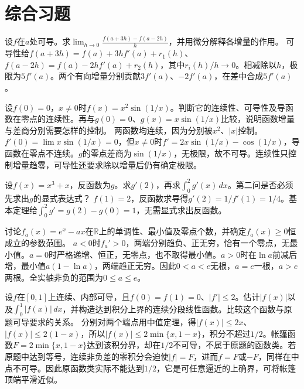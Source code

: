 \par\addvspace{12pt}

\section{综合习题}

设\(f\)在\(a\)处可导。求\(\displaystyle\lim_{h\to0}\frac{f(a+3h)-f(a-2h)}h\)，并用微分解释各增量的作用。
\solutionanswer
可导性给\(f(a+3h)=f(a)+3hf'(a)+r_1(h)\)、\(f(a-2h)=f(a)-2hf'(a)+r_2(h)\)，其中\(r_i(h)/h\to0\)。相减除以\(h\)，极限为\(5f'(a)\)。两个有向增量分别贡献\(3f'(a)\)、\(-2f'(a)\)，在差中合成\(5f'(a)\)。


设\(f(0)=0\)，\(x\ne0\)时\(f(x)=x^2\sin(1/x)\)。判断它的连续性、可导性及导函数在零点的连续性。再与\(g(0)=0\)、\(g(x)=x\sin(1/x)\)比较，说明函数增量与差商分别需要怎样的控制。
\solutionanswer
两函数均连续，因为分别被\(x^2\)、\(|x|\)控制。\(f'(0)=\lim x\sin(1/x)=0\)，但\(x\ne0\)时\(f'=2x\sin(1/x)-\cos(1/x)\)，导函数在零点不连续。\(g\)的零点差商为\(\sin(1/x)\)，无极限，故不可导。连续性只控制增量趋零，可导性还要求除以增量后仍有确定极限。


设\(f(x)=x^3+x\)，反函数为\(g\)。求\(g'(2)\)，再求\(\int_0^2g'(x)\,dx\)。第二问是否必须先求出\(g\)的显式表达式？
\solutionanswer
\(f(1)=2\)，反函数求导得\(g'(2)=1/f'(1)=1/4\)。基本定理给\(\int_0^2g'=g(2)-g(0)=1\)，无需显式求出反函数。


讨论\(f_a(x)=e^x-ax\)在\(\mathbb R\)上的单调性、最小值及零点个数，并确定\(f_a(x)\ge0\)恒成立的参数范围。
\solutionanswer
\(a<0\)时\(f_a'>0\)，两端分别趋负、正无穷，恰有一个零点，无最小值。\(a=0\)时严格递增、恒正，无零点，也不取得最小值。\(a>0\)时在\(\ln a\)前减后增，最小值\(a(1-\ln a)\)，两端趋正无穷。因此\(0<a<e\)无根，\(a=e\)一根，\(a>e\)两根。全实轴非负的范围为\(0\le a\le e\)。


设\(f\)在\([0,1]\)上连续、内部可导，且\(f(0)=f(1)=0\)、\(|f'|\le2\)。估计\(|f(x)|\)以及\(\int_0^1|f(x)|\,dx\)，并构造达到积分上界的连续分段线性函数。比较这个函数与原题可导要求的关系。
\solutionanswer
分别对两个端点用中值定理，得\(|f(x)|\le2x\)、\(|f(x)|\le2(1-x)\)，所以\(|f(x)|\le2\min\{x,1-x\}\)，积分不超过\(1/2\)。帐篷函数\(F=2\min\{x,1-x\}\)达到该积分界，却在\(1/2\)不可导，不属于原题的函数类。若原题中达到等号，连续非负差的零积分会迫使\(|f|=F\)，进而\(f=F\)或\(-F\)，同样在中点不可导。因此原函数类实际不能达到\(1/2\)，它是可任意逼近的上确界，可将帐篷顶端平滑近似。


